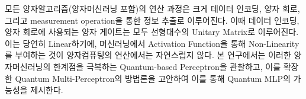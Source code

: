 모든 양자알고리즘(양자머신러닝 포함)의 연산 과정은 크게 데이터 인코딩, 양자 회로, 그리고 measurement operation을 통한 정보 추출로 이루어진다. 이때 데이터 인코딩, 양자 회로에 사용되는 양자 게이트는 모두 선형대수의 Unitary Matrix로 이루어진다. 이는 당연히 Linear하기에, 머신러닝에서 Activation Function을 통해 Non-Linearity를 부여하는 것이 양자컴퓨팅의 연산에서는 자연스럽지 않다. 본 연구에서는 이러한 양자머신러닝의 한계점을 극복하는 Quantum-based Perceptron을 관찰하고, 이를 확장한 Quantum Multi-Perceptron의 방법론을 고안하여 이를 통해 Quantum MLP의 가능성을 제시한다.